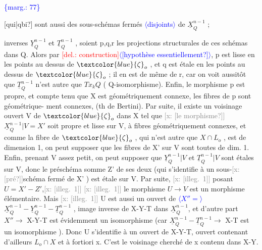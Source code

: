 \documentclass[11pt]{article}
\newcommand{\scanpage}[1]{\par\bigskip\noindent{\small\sffamily[scan #1]}\par}
\newcommand{\mspage}[1]{{\small\sffamily[p.\,#1]}}
\newcommand{\hand}[1]{\textcolor{blue}{#1}}
\newcommand{\inserted}[2][]{\textcolor{blue}{$\langle$#2$\rangle$}}
\newcommand{\margin}[1]{\textcolor{blue}{\{\textsf{marg.:} #1\}}}
\newcommand{\deleted}[1]{\textcolor{red}{[\textsf{del.:} #1]}}
\newcommand{\xout}[1]{\textcolor{gray}{[\textsf{x:} #1]}}
\newcommand{\unsure}[1]{[#1?]}
\newcommand{\illegible}[1]{[\textsf{illeg.\ #1}]}
\begin{document}
\margin{77}

\clearpage
\scanpage{25/78}
\mspage{\hand{73}}
\unsure{qui|qbi} sont aussi des sous-schémas fermés \inserted{disjoints} de $\underline{X}^{n-1}_Q$ ;

inverses $\underline{Y}^{n-1}_Q$ et $\underline{T}^{n-1}_Q$ , soient p,q,r les projections structurales
de ces schémas dans Q. Alors par \deleted{construction}\inserted{\unsure{hypothèse essentiellement}}, p est lisse en les
points au dessus de $\hand{\zeta}_o$ , et q est étale en les points au dessus de $\hand{\zeta}_o$ ;
il en est de même de r, car on voit aussitôt que $\underline{T}^{n-1}_Q$ n'est autre que
$Tx_kQ$ ( Q-isomorphisme). Enfin, le morphisme p est propre, et compte
tenu que X est géométriquement connexe, les fibres de p sont géométrique-%
ment connexes, (th de Bertini). Par suite, il existe un voisinage ouvert
V de $\hand{\zeta}_o$ dans X tel que \xout{\unsure{le morphisme}} $\underline{X}^{n-1}_Q|V = X'$ soit propre et lisse
sur V, à fibres géométriquement connexes, et comme la fibre de $\hand{\zeta}_o$ ,
qui n'est autre que $X\cap L_o$ , est de dimension 1, on peut supposer que les
fibres de X' sur V sont toutes de dim. 1. Enfin, prenant V assez petit,
on peut supposer que $\underline{Y}^{n-1}_Q|V$ et $\underline{T}^{n-1}_Q|V$ sont étales sur V, donc le
préschéma somme Z' de ses deux (qui s'identifie à un sous-\xout{\unsure{pré}}schéma
fermé de X' ) est étale sur V. Par suite, \xout{\illegible{1}} posant $U = X' - Z'$,\xout{\illegible{1}}
\xout{\illegible{1}} le morphisme $U\to V$ est un morphisme élémentaire. Mais \xout{\illegible{1}} U est aussi
un ouvert de \inserted{$X''=$}$\underline{X}^{n-1}_Q - \underline{Y}^{n-1}_Q - \underline{T}^{n-1}_Q$ , image inverse de X-Y-T dans $\underline{X}^{n-1}_Q$,
et d'autre part $X''\to$ X-Y-T est évidemment un isomorphisme (car
$\underline{X}^{n-1}_Q - \underline{T}^{n-1}_Q \to$ X-T est un isomorphisme ). Donc U s'identifie à un ouvert
de X-Y-T, ouvert contenant d'ailleurs $L_o\cap X$ et à fortiori x. C'est le
voisinage cherché de x contenu dans X-Y.

\mspage{\hand{78}}
\end{document}
